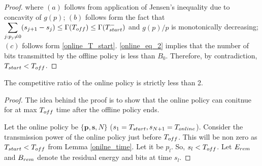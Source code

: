 \begin{proof}
where $(a)$ follows from application of Jensen's inequality due to concavity of $g(p)$; $(b)$ follows form the fact that $\displaystyle\sum_{j:p_j\neq 0}(s_{j+1}-s_{j})\le\TRx(T_{\mbox{\scriptsize{off}}})\le \TRx(T_{\mbox{\scriptsize{start}}}^-)$ and $g(p)/p$ is monotonically decreasing; $(c)$ follows form \eqref{online_T_start}. \eqref{online_eq_2} implies that the number of bits transmitted by the offline policy is less than $B_0$. Therefore, by contradiction, $T_{\mbox{\scriptsize{start}}}<T_{\mbox{\scriptsize{off}}}$.
\end{proof}



\begin{theorem}
The competitive ratio of the online policy is strictly less than 2.
\end{theorem}
\begin{proof}

The idea behind the proof is to show that the online policy can conitnue for at max $T_{\mbox{\scriptsize{off}}}$ time  after the offline policy ends.

Let the online policy be $\{\bm{{p}},\bm{{s}},{N}\}$ ($s_1=T_{\mbox{\scriptsize{start}}}, s_{N+1}=T_{\mbox{\scriptsize{online}}}$). Consider the transmission power of the online policy just before $T_{\mbox{\scriptsize{off}}}$. This will be non zero as $T_{\mbox{\scriptsize{start}}}<T_{\mbox{\scriptsize{off}}}$ from Lemma \ref{onilne_time}. Let it be ${p}_l$. So, $s_l<T_{\mbox{\scriptsize{off}}}$. Let $E_{\mbox{\scriptsize{rem}}}$ and $B_{\mbox{\scriptsize{rem}}}$ denote the residual energy and bits at time ${s}_{l}$.


\end{proof}
